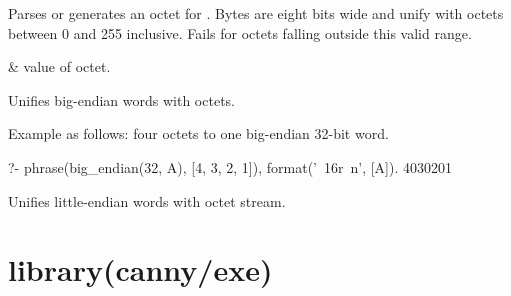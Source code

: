\begin{description}
Parses or generates an octet for . Bytes are eight bits wide and
unify with octets between 0 and 255 inclusive. Fails for octets
falling outside this valid range.

\begin{arguments}
 & value of octet. \\
\end{arguments}

Unifies big-endian words with octets.

Example as follows: four octets to one big-endian 32-bit word.

\begin{code}
?- phrase(big_endian(32, A), [4, 3, 2, 1]),
   format('~16r~n', [A]).
4030201
\end{code}

Unifies little-endian words with octet stream.
\end{description}

\chapter{library(canny/exe)}\label{sec:exe}

